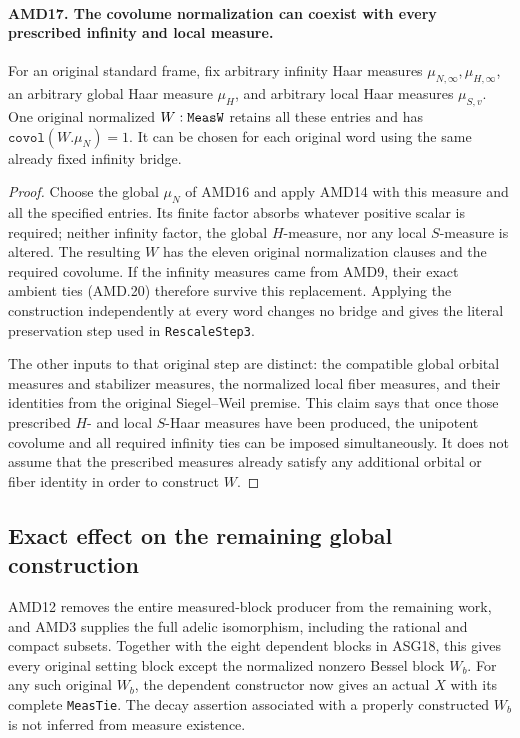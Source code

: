 \documentclass[11pt,a4paper]{article}
\numberwithin{equation}{section}
\theoremstyle{remark}\newtheorem{remark}[theorem]{Remark}
\begin{document}
\paragraph{AMD17. The covolume normalization can coexist with every prescribed infinity and local measure.}
\label{claim:AMD17}
For an original standard frame, fix arbitrary infinity Haar
measures \(\mu_{N,\infty},\mu_{H,\infty}\), an arbitrary
global Haar measure \(\mu_H\), and arbitrary local Haar
measures \(\mu_{S,v}\).  One original normalized
\(W:\texttt{Meas\allowbreak W}\) retains all these entries and has
\(\texttt{covol}(W.\mu_N)=1\).  It can be chosen for each
original word using the same already fixed infinity bridge.

\begin{proof}
Choose the global \(\mu_N\) of AMD16 and apply AMD14 with
this measure and all the specified entries.  Its finite factor
absorbs whatever positive scalar is required; neither infinity
factor, the global \(H\)-measure, nor any local \(S\)-measure
is altered.  The resulting \(W\) has the eleven original
normalization clauses and the required covolume.  If the
infinity measures came from AMD9, their exact ambient ties
(AMD.20) therefore survive this replacement.  Applying the
construction independently at every word changes no bridge
and gives the literal preservation step used in
\texttt{Rescale\allowbreak Step3}.

The other inputs to that original step are distinct: the
compatible global orbital measures and stabilizer measures,
the normalized local fiber measures, and their identities from
the original Siegel--Weil premise.  This claim says that once
those prescribed \(H\)- and local \(S\)-Haar measures have
been produced, the unipotent covolume and all required infinity
ties can be imposed simultaneously.  It does not assume that
the prescribed measures already satisfy any additional orbital
or fiber identity in order to construct \(W\).
\end{proof}

\subsection{Exact effect on the remaining global construction}

AMD12 removes the entire measured-block producer from the
remaining work, and AMD3 supplies the full adelic isomorphism,
including the rational and compact subsets.  Together with the
eight dependent blocks in ASG18, this gives every original
setting block except the normalized nonzero Bessel block
\(W_b\).  For any such original \(W_b\), the dependent
constructor now gives an actual \(X\) with its complete
\texttt{Meas\allowbreak Tie}.  The decay assertion associated with a
properly constructed \(W_b\) is not inferred from measure
existence.
\end{document}
